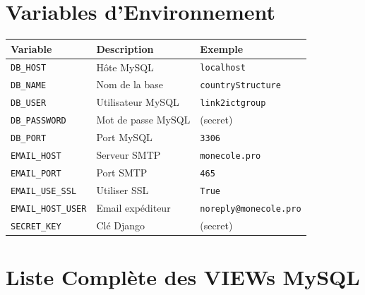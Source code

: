 \documentclass[12pt,a4paper,oneside]{report}
\begin{document}
\chapter{Variables d'Environnement}

\begin{center}
\begin{tabularx}{\textwidth}{l X l}
\toprule
\textbf{Variable} & \textbf{Description} & \textbf{Exemple} \\
\midrule
\texttt{DB\_HOST} & Hôte MySQL & \texttt{localhost} \\
\texttt{DB\_NAME} & Nom de la base & \texttt{countryStructure} \\
\texttt{DB\_USER} & Utilisateur MySQL & \texttt{link2ictgroup} \\
\texttt{DB\_PASSWORD} & Mot de passe MySQL & (secret) \\
\texttt{DB\_PORT} & Port MySQL & \texttt{3306} \\
\texttt{EMAIL\_HOST} & Serveur SMTP & \texttt{monecole.pro} \\
\texttt{EMAIL\_PORT} & Port SMTP & \texttt{465} \\
\texttt{EMAIL\_USE\_SSL} & Utiliser SSL & \texttt{True} \\
\texttt{EMAIL\_HOST\_USER} & Email expéditeur & \texttt{noreply@monecole.pro} \\
\texttt{SECRET\_KEY} & Clé Django & (secret) \\
\bottomrule
\end{tabularx}
\end{center}

\chapter{Liste Complète des VIEWs MySQL}
\end{document}
